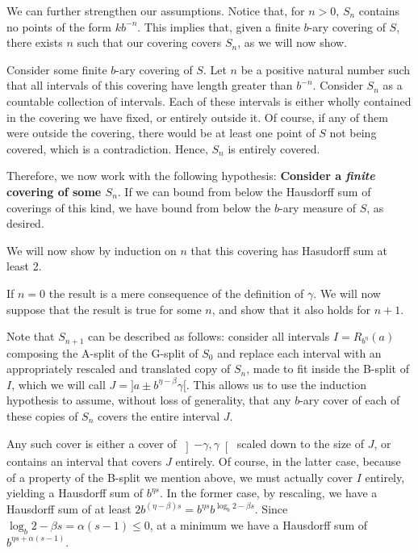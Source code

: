 \documentclass[11pt, reqno]{amsart}
\begin{document}
We can further strengthen our assumptions. Notice that, for $n > 0$, $S_n$ contains no points of the form $k b^{-n}$. This implies that, given a finite $b$-ary covering of $S$, there exists $n$ such that our covering covers $S_n$, as we will now show.

Consider some finite $b$-ary covering of $S$. Let $n$ be a positive natural number such that all intervals of this covering have length greater than $b^{-n}$. Consider $S_n$ as a countable collection of intervals. Each of these intervals is either wholly contained in the covering we have fixed, or entirely outside it. Of course, if any of them were outside the covering, there would be at least one point of $S$ not being covered, which is a contradiction. Hence, $S_n$ is entirely covered.

Therefore, we now work with the following hypothesis: \textbf{Consider a \emph{finite} covering of some $S_n$}. If we can bound from below the Hausdorff sum of coverings of this kind, we have bound from below the $b$-ary measure of $S$, as desired.

We will now show by induction on $n$ that this covering has Hasudorff sum at least 2.

If $n = 0$ the result is a mere consequence of the definition of $\gamma$. We will now suppose that the result is true for some $n$, and show that it also holds for $n+1$.

Note that $S_{n+1}$ can be described as follows: consider all intervals $I = R_{b^\eta}(a)$ composing the A-split of the G-split of $S_0$ and replace each interval with an appropriately rescaled and translated copy of $S_n$, made to fit inside the B-split of $I$, which we will call $J = ]a \pm b^{\eta - \beta} \gamma[$. This allows us to use the induction hypothesis to assume, without loss of generality, that any $b$-ary cover of each of these copies of $S_n$ covers the entire interval $J$.

Any such cover is either a cover of $\left]-\gamma, \gamma \right[$ scaled down to the size of $J$, or contains an interval that covers $J$ entirely. Of course, in the latter case, because of a property of the B-split we mention above, we must actually cover $I$ entirely, yielding a Hausdorff sum of $b^{\eta s}$. In the former case, by rescaling, we have a Hausdorff sum of at least $2 b^{(\eta - \beta) s} = b^{\eta s} b^{\log_b 2 - \beta s}$. Since $\log_b 2 - \beta s = \alpha (s - 1) \leq 0$, at a minimum we have a Hausdorff sum of $b^{\eta s + \alpha (s - 1)}$.
\end{document}
